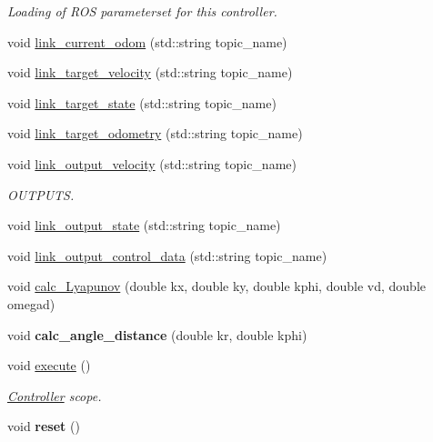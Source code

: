 \begin{DoxyCompactItemize}
\begin{DoxyCompactList}\small\item\em Loading of R\+OS parameterset for this controller. \end{DoxyCompactList}\item 
void \hyperlink{classController_add4a8227097c30e5f165977cfa0ce22c}{link\+\_\+current\+\_\+odom} (std\+::string topic\+\_\+name)
\item 
void \hyperlink{classController_a82a7c805f6e4e0689c675134903e9e58}{link\+\_\+target\+\_\+velocity} (std\+::string topic\+\_\+name)
\item 
void \hyperlink{classController_a5f5318b08e7b99d2e5f09c59a6eb61aa}{link\+\_\+target\+\_\+state} (std\+::string topic\+\_\+name)
\item 
void \hyperlink{classController_a7bf32883aed714275c99d6d182993b73}{link\+\_\+target\+\_\+odometry} (std\+::string topic\+\_\+name)
\item 
void \hyperlink{classController_afdf03808aee4a1cfcf65a7198ab1a9aa}{link\+\_\+output\+\_\+velocity} (std\+::string topic\+\_\+name)
\begin{DoxyCompactList}\small\item\em O\+U\+T\+P\+U\+TS. \end{DoxyCompactList}\item 
void \hyperlink{classController_a9b8949013d52e365754e170a9cad158c}{link\+\_\+output\+\_\+state} (std\+::string topic\+\_\+name)
\item 
void \hyperlink{classController_abc1909639580e5359228c87fbd3a622b}{link\+\_\+output\+\_\+control\+\_\+data} (std\+::string topic\+\_\+name)
\item 
void \hyperlink{classController_a56568ee07bb72983576e9d7c10eb3e83}{calc\+\_\+\+Lyapunov} (double kx, double ky, double kphi, double vd, double omegad)
\item 
void {\bfseries calc\+\_\+angle\+\_\+distance} (double kr, double kphi)\hypertarget{classController_a63249412728814430174c740d358a5c0}{}\label{classController_a63249412728814430174c740d358a5c0}

\item 
void \hyperlink{classController_a6661eb7307219216a7cb0a90e2a07e4d}{execute} ()\hypertarget{classController_a6661eb7307219216a7cb0a90e2a07e4d}{}\label{classController_a6661eb7307219216a7cb0a90e2a07e4d}

\begin{DoxyCompactList}\small\item\em \hyperlink{classController}{Controller} scope. \end{DoxyCompactList}\item 
void {\bfseries reset} ()\hypertarget{classController_ab5515748f1b0c82f015e039c817ee5f7}{}\label{classController_ab5515748f1b0c82f015e039c817ee5f7}


\end{DoxyCompactItemize}
